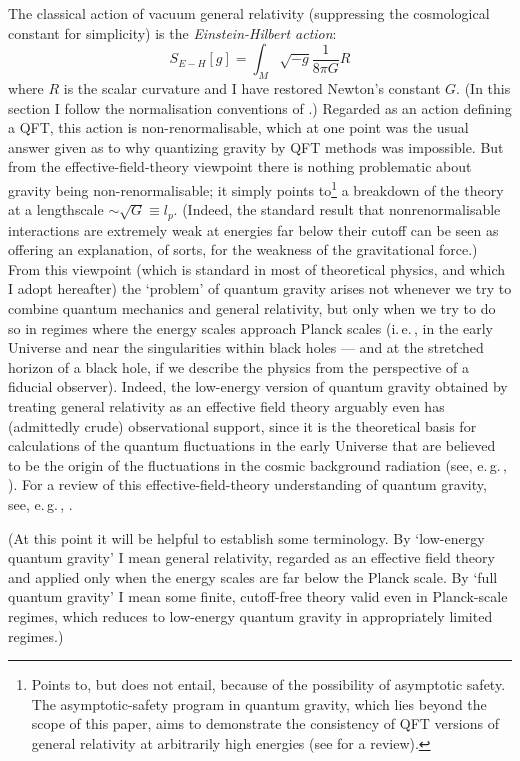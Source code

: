 \documentclass{article}
\newcommand{\iec}{\mbox{i.\,e.\,}}
\newcommand{\egc}{\mbox{e.\,g.\,}}
\newcommand{\be}{\begin{equation}}
\newcommand{\ee}{\end{equation}}
\begin{document}
The classical action of vacuum general relativity (suppressing the cosmological constant for simplicity) is the \emph{Einstein-Hilbert action}:
\be
S_{E-H}[g]=\int_M \sqrt{-g} \frac{1}{8\pi G}  R 
\ee
where $R$ is the scalar curvature and I have restored Newton's constant $G$. (In this section I follow the normalisation conventions of .) Regarded as an action defining a QFT, this action is non-renormalisable, which at one point was the usual answer given as to why quantizing gravity by QFT methods was impossible. But from the effective-field-theory viewpoint there is nothing problematic about gravity being non-renormalisable; it simply points to\footnote{Points to, but does not entail, because of the possibility of asymptotic safety. The asymptotic-safety program in quantum gravity, which lies beyond the scope of this paper, aims to demonstrate the consistency of QFT versions of general relativity at arbitrarily high energies (see  for a review).} a breakdown of the theory at a lengthscale $\sim \sqrt{G}\equiv l_p$. (Indeed, the standard result that nonrenormalisable interactions are extremely weak at energies far below their cutoff can be seen as offering an explanation, of sorts, for the weakness of the gravitational force.) From this viewpoint (which is standard in most of theoretical physics, and which I adopt hereafter) the `problem' of quantum gravity arises not whenever we try to combine quantum mechanics and general relativity, but only when we try to do so in regimes where the energy scales approach Planck scales (\iec, in the early Universe and near the singularities within black holes --- and at the stretched horizon of a black hole, if we describe the physics from the perspective of a fiducial observer). Indeed, the low-energy version of quantum gravity obtained by treating general relativity as an effective field theory arguably even has (admittedly crude) observational support, since it is the theoretical basis for  calculations of the quantum fluctuations in the early Universe that are believed to be the origin of the fluctuations in the cosmic background radiation (see, \egc, ). For a review of this effective-field-theory understanding of quantum gravity, see, \egc, .

(At this point it will be helpful to establish some terminology.  By `low-energy quantum gravity' I mean general relativity, regarded as an effective field theory and applied only when the energy scales are far below the Planck scale. By `full quantum gravity' I mean some finite, cutoff-free theory valid even in Planck-scale regimes, which reduces to low-energy quantum gravity in appropriately limited regimes.)
\end{document}
